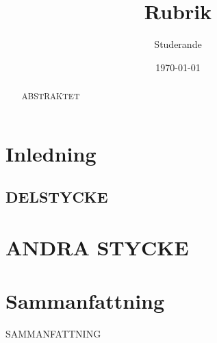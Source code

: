\documentclass[swedish]{tktltiki}
\theoremstyle{definition}
\begin{document}
\onehalfspacing
\title{Rubrik}
\author{Studerande}
\date{\today}
\maketitle
{}

\begin{abstract}
	ABSTRAKTET

\end{abstract}
\mytableofcontents

\section{Inledning} 


\subsection{DELSTYCKE}

\section{ANDRA STYCKE} \label{invariants}

\section{Sammanfattning} \label{summary}

SAMMANFATTNING

\nocite{*}
%
%

%

\lastpage
\appendices
\end{document}

